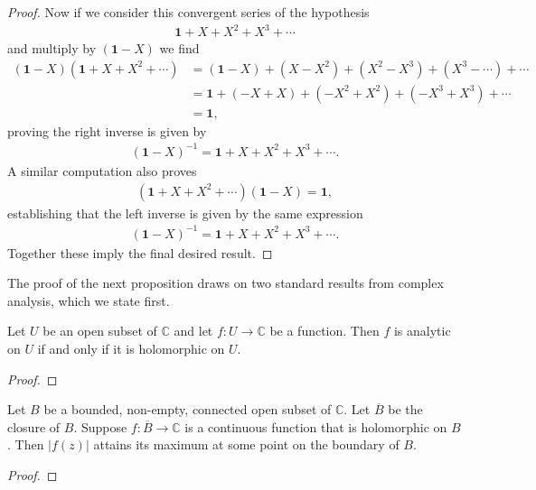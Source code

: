 \begin{proof}
Now if we consider this convergent series of the hypothesis
\begin{align}
    \mathbf{1} + X + X^2 + X^3 + \cdots
\end{align}
and multiply by $(\mathbf{1} - X)$ we find
\begin{align}
    (\mathbf{1} - X) \left( \mathbf{1} + X + X^2 + \cdots \right) &= (\mathbf{1} - X) + (X - X^2) + (X^2 - X^3) + (X^3 - \cdots) + \cdots \\
                                                                  &= \mathbf{1} + (- X + X) + (- X^2 + X^2) + (-X^3 + X^3) + \cdots \\
                                                                  &= \mathbf{1},
\end{align}
proving the right inverse is given by
\begin{align}
    (\mathbf{1} - X)^{-1} = \mathbf{1} + X + X^2 + X^3 + \cdots.
\end{align}
A similar computation also proves
\begin{align}
    \left( \mathbf{1} + X + X^2 + \cdots \right) (\mathbf{1} - X) = \mathbf{1},
\end{align}
establishing that the left inverse is given by the same expression
\begin{align}
    (\mathbf{1} - X)^{-1} = \mathbf{1} + X + X^2 + X^3 + \cdots.
\end{align}
Together these imply the final desired result.
\end{proof}

The proof of the next proposition draws on two standard results from complex analysis, which we state first.

\begin{theorem}
    \label{thrm:analytic-equivalence-theorem}
    \leanok
    Let $U$ be an open subset of $\mathbb{C}$ and let $f: U \rightarrow \mathbb{C}$ be a function. Then $f$ is analytic on $U$ if and only if it is holomorphic on $U$.
\end{theorem}
\begin{proof}
\leanok
\end{proof}

\begin{theorem}
    \label{thrm:maximum-modulus-principle}
    \leanok
    Let $B$ be a bounded, non-empty, connected open subset of $\mathbb{C}$. Let $\overline{B}$ be the closure of $B$. Suppose $f : \overline{B} \rightarrow \mathbb{C}$ is a continuous function that is holomorphic on $B$. Then $\lvert f(z) \rvert$ attains its maximum at some point on the boundary of $B$.
\end{theorem}
\begin{proof}
\leanok
\end{proof}

